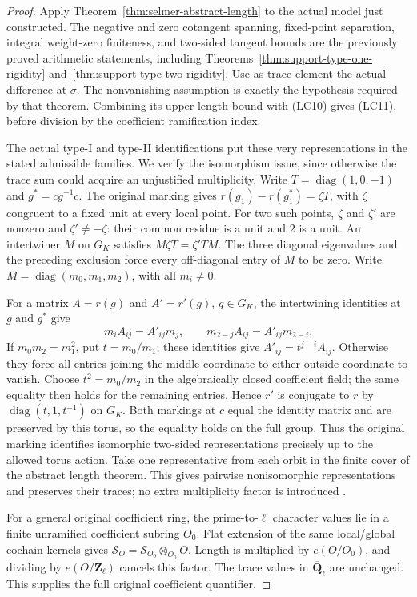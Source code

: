 \begin{proof}
Apply Theorem~\ref{thm:selmer-abstract-length} to the actual model
just constructed.  The negative and zero cotangent spanning,
fixed-point separation, integral weight-zero finiteness, and
two-sided tangent bounds are the previously proved arithmetic
statements, including Theorems~\ref{thm:support-type-one-rigidity}
and~\ref{thm:support-type-two-rigidity}.  Use as trace element the
actual difference at $\sigma$.  The nonvanishing assumption is
exactly the hypothesis required by that theorem.  Combining its
upper length bound with (LC10) gives (LC11), before division by
the coefficient ramification index.

The actual type-I and type-II identifications put these very
representations in the stated admissible families.  We verify the
isomorphism issue, since otherwise the trace sum could acquire an
unjustified multiplicity.  Write $T=\operatorname{diag}(1,0,-1)$
and $g^*=cg^{-1}c$.  The original marking gives
$r(g_1)-r(g_1^*)=\zeta T$, with $\zeta$ congruent to a fixed
unit at every local point.  For two such points, $\zeta$ and
$\zeta'$ are nonzero and $\zeta'\ne-\zeta$: their common
residue is a unit and $2$ is a unit.  An intertwiner $M$ on $G_K$
satisfies $M\zeta T=\zeta'TM$.  The three diagonal eigenvalues
and the preceding exclusion force every off-diagonal entry of $M$
to be zero.  Write $M=\operatorname{diag}(m_0,m_1,m_2)$, with
all $m_i\ne0$.

For a matrix $A=r(g)$ and $A'=r'(g)$, $g\in G_K$, the
intertwining identities at $g$ and $g^*$ give
\[
 m_i A_{ij}=A'_{ij}m_j,\qquad
 m_{2-j}A_{ij}=A'_{ij}m_{2-i}.
\]
If $m_0m_2=m_1^2$, put $t=m_0/m_1$; these identities give
$A'_{ij}=t^{j-i}A_{ij}$.  Otherwise they force all entries
joining the middle coordinate to either outside coordinate to
vanish.  Choose $t^2=m_0/m_2$ in the algebraically closed
coefficient field; the same equality then holds for the remaining
entries.  Hence $r'$ is conjugate to $r$ by
$\operatorname{diag}(t,1,t^{-1})$ on $G_K$.  Both markings at
$c$ equal the identity matrix and are preserved by this torus, so
the equality holds on the full group.  Thus the original marking
identifies isomorphic two-sided representations precisely up to
the allowed torus action.
Take one representative from each orbit in the finite cover of the
abstract length theorem.  This gives pairwise nonisomorphic
representations and preserves their traces; no extra multiplicity
factor is introduced \cite{support-local-chart-source}.

For a general original coefficient ring, the prime-to-$\ell$
character values lie in a finite unramified coefficient subring
$O_0$.  Flat extension of the same local/global cochain kernels
gives $\mathcal S_O=\mathcal S_{O_0}\otimes_{O_0}O$.
Length is multiplied by $e(O/O_0)$, and dividing by
$e(O/\mathbf Z_\ell)$ cancels this factor.  The trace values in
$\overline{\mathbf Q}_\ell$ are unchanged.  This supplies the
full original coefficient quantifier.
\end{proof}

